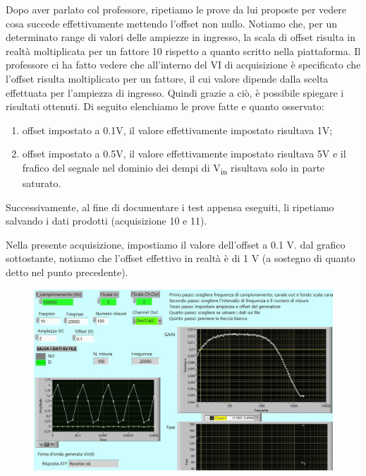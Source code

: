 
Dopo aver parlato col professore, ripetiamo le prove da lui proposte per vedere cosa succede effettivamente mettendo l'offset non nullo. Notiamo che, per un determinato range di valori delle ampiezze in ingresso, la scala di offset risulta in realtà moltiplicata per un fattore 10 rispetto a quanto scritto nella piattaforma. 
Il professore ci ha fatto vedere che all'interno del VI di acquisizione è specificato che l'offset risulta moltiplicato per un fattore, il cui valore dipende dalla scelta effettuata per l'ampiezza di ingresso. Quindi grazie a ciò, è possibile spiegare i risultati ottenuti. 
Di seguito elenchiamo le prove fatte e quanto osservato:
\begin{enumerate}
    \item offset impostato a 0.1V, il valore effettivamente impostato risultava 1V;
    \item offset impostato a 0.5V, il valore effettivamente impostato risultava 5V e il frafico del segnale nel dominio dei dempi di V\textsubscript{in} risultava solo in parte saturato.
\end{enumerate}

Successivamente, al fine di documentare i test appensa eseguiti, li ripetiamo salvando i dati prodotti (acquisizione 10 e 11).

Nella presente acquisizione, impostiamo il valore dell'offset a 0.1 V. dal grafico sottostante, notiamo che l'offset effettivo in realtà è di 1 V (a sostegno di quanto detto nel punto precedente).

\begin{figure}[H]
\caption{}
    \includegraphics[width=12cm]{settimana_2/immagini/rccr_10.jpg}
    \centering
\end{figure}

